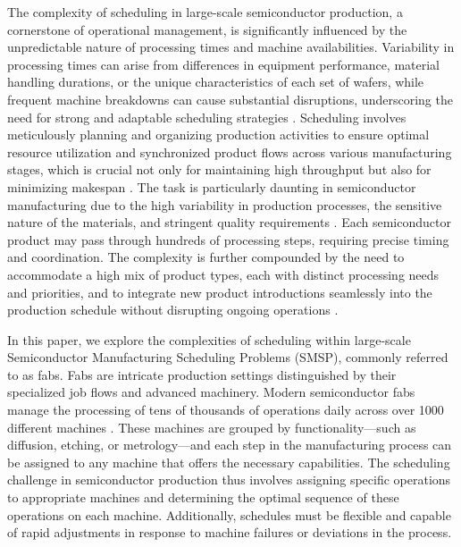 The complexity of scheduling in large-scale semiconductor production, a cornerstone of operational management, is significantly influenced by the unpredictable nature of processing times and machine availabilities. Variability in processing times can arise from differences in equipment performance, material handling durations, or the unique characteristics of each set of wafers, while frequent machine breakdowns can cause substantial disruptions, underscoring the need for strong and adaptable scheduling strategies \cite{leachman1996benchmarking}. Scheduling involves meticulously planning and organizing production activities to ensure optimal resource utilization and synchronized product flows across various manufacturing stages, which is crucial not only for maintaining high throughput but also for minimizing makespan \cite{schumann2022scheduling}. The task is particularly daunting in semiconductor manufacturing due to the high variability in production processes, the sensitive nature of the materials, and stringent quality requirements \cite{May2006}. Each semiconductor product may pass through hundreds of processing steps, requiring precise timing and coordination. The complexity is further compounded by the need to accommodate a high mix of product types, each with distinct processing needs and priorities, and to integrate new product introductions seamlessly into the production schedule without disrupting ongoing operations \cite{Moench2011}.

In this paper, we explore the complexities of scheduling within large-scale Semiconductor Manufacturing Scheduling Problems (SMSP), commonly referred to as fabs. Fabs are intricate production settings distinguished by their specialized job flows and advanced machinery. Modern semiconductor fabs manage the processing of tens of thousands of operations daily across over 1000 different machines \cite{kopp2020smt2020}. These machines are grouped by functionality—such as diffusion, etching, or metrology—and each step in the manufacturing process can be assigned to any machine that offers the necessary capabilities. The scheduling challenge in semiconductor production thus involves assigning specific operations to appropriate machines and determining the optimal sequence of these operations on each machine. Additionally, schedules must be flexible and capable of rapid adjustments in response to machine failures or deviations in the process.

